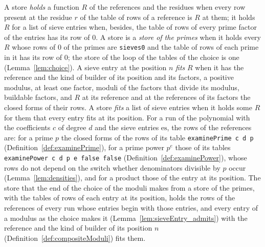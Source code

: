 \begin{lemma}\label{lem:storeTables}
  \leanok
  A store \emph{holds} a function $R$ of the references and the residues when every row present at
  the residue $r$ of the table of rows of a reference is $R$ at them; it holds $R$ for a list of
  sieve entries when, besides, the table of rows of every prime factor of the entries has its row of
  $0$. A store is a \emph{store of the primes} when it holds every $R$ whose rows of $0$ of the
  primes are \verb|sieves0| and the table of rows of each prime in it has its row of $0$; the store
  of the loop of the tables of the choice is one (Lemma~\ref{lem:choice}). A sieve entry at the
  position $n$ \emph{fits} $R$ when it has the reference and the kind of builder of its position and
  its factors, a positive modulus, at least one factor, moduli of the factors that divide its
  modulus, buildable factors, and $R$ at its reference and at the references of its factors the
  closed forms of their rows. A store \emph{fits} a list of sieve entries when it holds some $R$ for
  them that every entry fits at its position. For a run of the polynomial with the coefficients $c$
  of degree $d$ and the sieve entries $\mathrm{es}$, the rows of the references are: for a prime $p$
  the closed forms of the rows of its table \verb|examinePrime c d p|
  (Definition~\ref{def:examinePrime}), for a prime power $p^e$ those of its tables
  \verb|examinePower c d p e false false| (Definition~\ref{def:examinePower}), whose rows do not
  depend on the switch whether denominators divisible by $p$ occur (Lemma~\ref{lem:densities}), and
  for a product those of the entry at its position. The store that the end of the choice of the
  moduli makes from a store of the primes, with the tables of rows of each entry at its position,
  holds the rows of the references of every run whose entries begin with those entries, and every
  entry of a modulus as the choice makes it (Lemma~\ref{lem:sieveEntry_admits}) with the reference
  and the kind of builder of its position $n$ (Definition~\ref{def:compositeModuli}) fits them.
\end{lemma}

